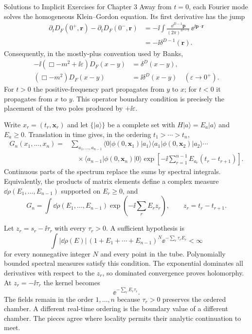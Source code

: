 \begin{bankssolutions}{Solutions to Implicit Exercises for Chapter 3}
Away from $t=0$, each Fourier mode solves the homogeneous Klein--Gordon
equation.  Its first derivative has the jump
\begin{align*}
 \partial_tD_F(0^+,\mathbf r)-\partial_tD_F(0^-,\mathbf r)
 &=-\ii\int\frac{\dd^{D-1}\mathbf p}{(2\pi)^{D-1}}\,
 \ee^{\ii\mathbf p\cdot\mathbf r}\\
 &=-\ii\delta^{D-1}(\mathbf r).
\end{align*}
Consequently, in the mostly-plus convention used by Banks,
\begin{align*}
 -\ii(\Box-m^2+\ii\varepsilon)D_F(x-y)&=\delta^D(x-y),\\
 (\Box-m^2)D_F(x-y)&=\ii\delta^D(x-y)
 \quad(\varepsilon\to0^+).
\end{align*}
For $t>0$ the positive-frequency part propagates from $y$ to $x$; for $t<0$
it propagates from $x$ to $y$.  This operator boundary condition is precisely
the placement of the two poles produced by $+\ii\varepsilon$.

Write $x_r=(t_r,\mathbf x_r)$ and let
$\{|a\rangle\}$ be a complete set with $H|a\rangle=E_a|a\rangle$ and
$E_a\geq0$.  Translation in time gives, in the ordering
$t_1>\cdots>t_n$,
\begin{align*}
 G_n(x_1,\ldots,x_n)
 ={}&\sum_{a_1,\ldots,a_{n-1}}
 \langle0|\phi(0,\mathbf x_1)|a_1\rangle
 \langle a_1|\phi(0,\mathbf x_2)|a_2\rangle\cdots\\
 &\quad\times
 \langle a_{n-1}|\phi(0,\mathbf x_n)|0\rangle
 \exp\!\left[-\ii\sum_{r=1}^{n-1}E_{a_r}(t_r-t_{r+1})\right].
\end{align*}
Continuous parts of the spectrum replace the sums by spectral integrals.
Equivalently, the products of matrix elements define a complex measure
$\dd\rho(E_1,\ldots,E_{n-1})$ supported on $E_r\geq0$, and
\[
 G_n=\int\dd\rho(E_1,\ldots,E_{n-1})
 \exp\!\left(-\ii\sum_rE_r z_r\right),
 \qquad z_r=t_r-t_{r+1}.
\]

Let $z_r=s_r-\ii\tau_r$ with every $\tau_r>0$.  A sufficient hypothesis is
\[
 \int |\dd\rho(E)|\,(1+E_1+\cdots+E_{n-1})^N
 \ee^{-\sum_r\tau_r E_r}<\infty
\]
for every nonnegative integer $N$ and every point in the tube.  Polynomially
bounded spectral measures satisfy this condition.  The exponential dominates
all derivatives with respect to the $z_r$, so dominated convergence proves
holomorphy.  At $z_r=-\ii\tau_r$ the kernel becomes
\[
 \ee^{-\sum_rE_r\tau_r}.
\]
The fields remain in the order $1,\ldots,n$ because $\tau_r>0$ preserves the
ordered chamber.  A different real-time ordering is the boundary value of a
different chamber.  The pieces agree where locality permits their analytic
continuation to meet.


\end{bankssolutions}
